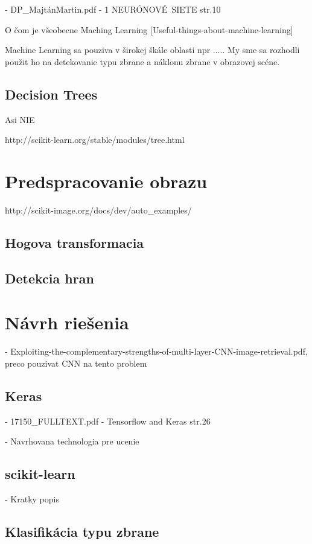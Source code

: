 \documentclass[10pt,a4paper]{article}
\begin{document}
- DP\_MajtánMartin.pdf - 1 NEURÓNOVÉ\ SIETE str.10

O čom je všeobecne Maching Learning
[Useful-things-about-machine-learning]

Machine Learning sa pouziva v širokej škále oblasti npr .....
My sme sa rozhodli použit ho na detekovanie typu zbrane a náklonu zbrane v obrazovej scéne.


\subsection{Decision Trees}
Asi NIE

http://scikit-learn.org/stable/modules/tree.html


\section{Predspracovanie obrazu}
http://scikit-image.org/docs/dev/auto\_examples/

\subsection{Hogova transformacia}

\subsection{Detekcia hran}


\section{Návrh riešenia}

- Exploiting-the-complementary-strengths-of-multi-layer-CNN-image-retrieval.pdf,
preco pouzivat CNN na tento problem

\subsection{Keras}
- 17150\_FULLTEXT.pdf - Tensorflow and Keras str.26

- Navrhovana technologia pre ucenie

\subsection{scikit-learn}
- Kratky popis

\subsection{Klasifikácia typu zbrane}
\end{document}
